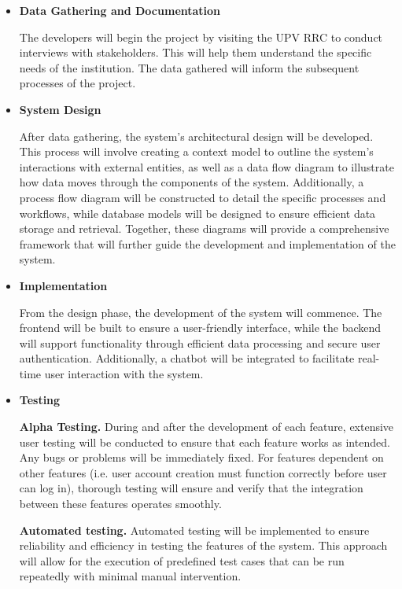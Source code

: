 \begin{itemize}
	\item \textbf{Data Gathering and Documentation}
	
	\subitem The developers will begin the project by visiting the UPV RRC to conduct interviews with stakeholders. This will help them understand the specific needs of the institution. The data gathered will inform the subsequent processes of the project.\newline
	
	\item \textbf{System Design}
	
	\subitem After data gathering, the system's architectural design will be developed. This process will involve creating a context model to outline the system's interactions with external entities, as well as a data flow diagram to illustrate how data moves through the components of the system. Additionally, a process flow diagram will be constructed to detail the specific processes and workflows, while database models will be designed to ensure efficient data storage and retrieval. Together, these diagrams will provide a comprehensive framework that will further guide the development and implementation of the system.\newline
	
	\item \textbf{Implementation}
	
	\subitem From the design phase, the development of the system will commence. The frontend will be built to ensure a user-friendly interface, while the backend will support functionality through efficient data processing and secure user authentication. Additionally, a chatbot will be integrated to facilitate real-time user interaction with the system.\newline
	
	\item \textbf{Testing}
	
	\subitem \textbf{Alpha Testing.} During and after the development of each feature, extensive user testing will be conducted to ensure that each feature works as intended. Any bugs or problems will be immediately fixed. For features dependent on other features (i.e. user account creation must function correctly before user can log in), thorough testing will ensure and verify that the integration between these features operates smoothly.\newline
	
	\subitem \textbf{Automated testing.} Automated testing will be implemented to ensure reliability and efficiency in testing the features of the system. This approach will allow for the execution of predefined test cases that can be run repeatedly with minimal manual intervention.\newline
	

\end{itemize}
